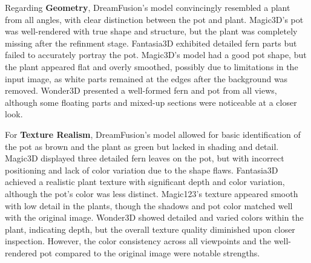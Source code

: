 Regarding \textbf{Geometry}, DreamFusion's model convincingly resembled a plant from all angles, with clear distinction between the pot and plant. Magic3D's pot was well-rendered with true shape and structure, but the plant was completely missing after the refinment stage. Fantasia3D exhibited detailed fern parts but failed to accurately portray the pot. Magic3D's model had a good pot shape, but the plant appeared flat and overly smoothed, possibly due to limitations in the input image, as white parts remained at the edges after the background was removed. Wonder3D presented a well-formed fern and pot from all views, although some floating parts and mixed-up sections were noticeable at a closer look.

For \textbf{Texture Realism}, DreamFusion's model allowed for basic identification of the pot as brown and the plant as green but lacked in shading and detail. Magic3D displayed three detailed fern leaves on the pot, but with incorrect positioning and lack of color variation due to the shape flaws. Fantasia3D achieved a realistic plant texture with significant depth and color variation, although the pot's color was less distinct. Magic123's texture appeared smooth with low detail in the plants, though the shadows and pot color matched well with the original image. Wonder3D showed detailed and varied colors within the plant, indicating depth, but the overall texture quality diminished upon closer inspection. However, the color consistency across all viewpoints and the well-rendered pot compared to the original image were notable strengths.

